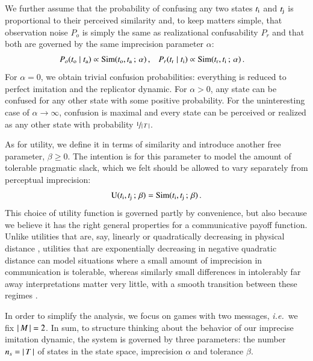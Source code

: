 \documentclass[fleqn,reqno,10pt]{article}
\newcommand{\imprecision}{\ensuremath{\alpha}} %
\newcommand{\toler}{\ensuremath{\beta}} %
\newcommand{\ns}{\ensuremath{n_s}} %
\newcommand{\similarity}{\ensuremath{\mathrm{Sim}}} %
\begin{document}
We further assume that the probability of confusing any two states $t_{\mathrm{i}}$ and
$t_{\mathrm{j}}$ is proportional to their perceived similarity and, to keep matters simple, that
observation noise $P_o$ is simply the same as realizational confusability $P_r$ and
that both are governed by the same imprecision parameter $\alpha$:
\begin{align*}
  P_o(\mystate{o} \probbar \mystate{a}) & \propto \similarity(\mystate{o}, \mystate{a} \myts ; \myts
  \imprecision)\,, &   P_r(\mystate{r} \probbar \mystate{i}) & \propto \similarity(\mystate{r}, \mystate{i} \myts ; \myts
  \imprecision) \,.
\end{align*}
For $\imprecision = 0$, we obtain trivial confusion probabilities: everything is reduced to
perfect imitation and the replicator dynamic. For $\imprecision > 0$, any state can be confused
for any other state with some positive probability. For the uninteresting case of
$\imprecision \rightarrow \infty$, confusion is maximal and every state can be perceived or
realized as any other state with probability $\nicefrac{1}{\left \lvert \, T \, \right\rvert}$.

As for utility, we define it in terms of similarity and introduce another free parameter, $\toler \ge 0$.
 The intention is for this parameter to model the amount of tolerable pragmatic slack, which we felt should be allowed to vary separately from perceptual imprecision:
\begin{align*}
  \util(\mystate{i}, \mystate{j} \myts ; \myts \toler) =
      \similarity(\mystate{i}, \mystate{j} \myts ; \myts \toler)\,.
\end{align*}
This choice of utility function is governed partly by convenience, but also because we believe it has the right general properties for a communicative payoff function.
Unlike utilities that are, say, linearly or
quadratically decreasing in physical distance
\citep[c.f.][]{JagerMetzger2011:Voronoi-Languag,FrankeJager2010:Vagueness-Signa}, utilities
that are exponentially decreasing in negative quadratic distance can model situations where a
small amount of imprecision in communication is tolerable, whereas similarly small differences
in intolerably far away interpretations matter very little, with a smooth transition between
these regimes \citep[c.f.][]{OConnor2013:The-Evolution-o}.

In order to simplify the analysis, we focus on games with two messages, \emph{i.e.}~we fix $\left \lvert \, M \, \right\rvert = 2$.
In sum, to structure thinking about the behavior of our imprecise imitation dynamic, the system
is governed by three parameters: the number $\ns = \card{T}$ of states in the state space,
imprecision $\imprecision$ and tolerance $\toler$.
\end{document}
